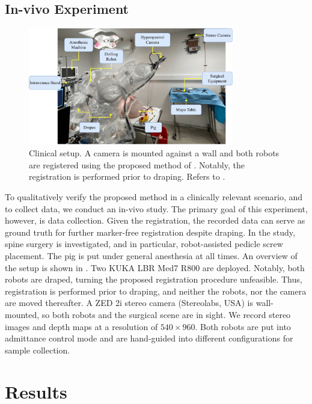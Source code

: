 \subsection{In-vivo Experiment}
\label{c1:sec:in_vivo_experiments}
\begin{figure}[tb]
    \centering
    \includegraphics[width=0.8\textwidth]{chapter_1/img/in_vivo_setup.pdf}
    \caption{Clinical setup. A camera is mounted against a wall and both robots are registered using the proposed method of . Notably, the registration is performed prior to draping. Refers to .}
    \label{c1:fig:in_vivo_setup}
\end{figure}
To qualitatively verify the proposed method in a clinically relevant scenario, and to collect data, we conduct an in-vivo study. The primary goal of this experiment, however, is data collection. Given the registration, the recorded data can serve as ground truth for further marker-free registration despite draping. In the study, spine surgery is investigated, and in particular, robot-assisted pedicle screw placement. The pig is put under general anesthesia at all times. An overview of the setup is shown in . Two KUKA LBR Med7 R800 are deployed. Notably, both robots are draped, turning the proposed registration procedure unfeasible. Thus, registration is performed prior to draping, and neither the robots, nor the camera are moved thereafter. A ZED 2i stereo camera (Stereolabs, USA) is wall-mounted, so both robots and the surgical scene are in sight. We record stereo images and depth maps at a resolution of $540 \times 960$. Both robots are put into admittance control mode and are hand-guided into different configurations for sample collection.

\section{Results}
\label{c1:sec:results}

